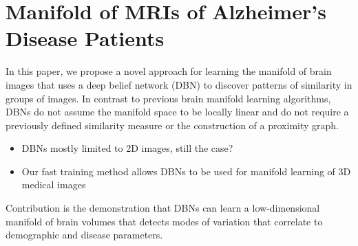 



\section{Manifold of MRIs of Alzheimer's Disease Patients}


In this paper, we propose a novel approach for learning the manifold of brain
images that uses a deep belief network (DBN) \citep{hinton2006b} to discover
patterns of similarity in groups of images. In contrast to previous
brain manifold learning algorithms, DBNs do not assume the manifold
space to be locally linear and do not require a previously defined similarity
measure or the construction of a proximity graph.
\begin{itemize}
\item DBNs mostly limited to 2D images, still the case?
\item Our fast training method allows DBNs to be used for manifold learning of
3D medical images
\end{itemize}

Contribution is the demonstration that DBNs can learn a low-dimensional manifold
of brain volumes that detects modes of variation that correlate to demographic
and disease parameters.

